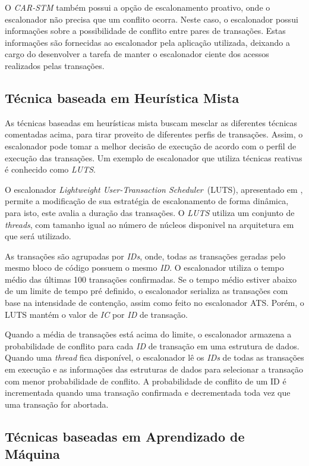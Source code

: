 \documentclass[ti]{texufpel} %
\begin{document}
O \emph{CAR-STM} também possui a opção de escalonamento proativo, onde o escalonador não precisa que um conflito ocorra. Neste caso, o escalonador possui informações sobre a possibilidade de conflito entre pares de transações. Estas informações são fornecidas ao escalonador pela aplicação utilizada, deixando a cargo do desenvolver a tarefa de manter o escalonador ciente dos acessos realizados pelas transações.

\subsection{Técnica baseada em Heurística Mista}

As técnicas baseadas em heurísticas mista buscam mesclar as diferentes técnicas comentadas acima, para tirar proveito de diferentes perfis de transações. Assim, o escalonador pode tomar a melhor decisão de execução de acordo com o perfil de execução das transações.  Um exemplo de escalonador que utiliza técnicas reativas é conhecido como \emph{LUTS}.

O escalonador \emph{Lightweight User-Transaction Scheduler}~(LUTS), apresentado em \cite{nicacio13}, permite a modificação de sua estratégia de escalonamento de forma dinâmica, para isto, este avalia a duração das transações. O \emph{LUTS} utiliza um conjunto de \emph{threads}, com tamanho igual ao número de núcleos disponivel na arquitetura em que será utilizado.

As transações são agrupadas por \emph{IDs}, onde, todas as transações geradas pelo mesmo bloco de código possuem o mesmo \emph{ID}. O escalonador utiliza o tempo médio das últimas 100 transações confirmadas. Se o tempo médio estiver abaixo de um limite de tempo pré definido, o escalonador serializa as transações com base na intensidade de contenção, assim como feito no escalonador ATS. Porém, o LUTS mantém o valor de \emph{IC} por \emph{ID} de transação.

Quando a média de transações está acima do limite, o escalonador armazena a probabilidade de conflito para cada \emph{ID} de transação em uma estrutura de dados. Quando uma \emph{thread} fica disponível, o escalonador lê os \emph{IDs} de todas as transações em execução e as informações das estruturas de dados para selecionar a transação com menor probabilidade de conflito. A probabilidade de conflito de um ID é incrementada quando uma transação confirmada e decrementada toda vez que uma transação for abortada.

\subsection{Técnicas baseadas em Aprendizado de Máquina}
\end{document}
